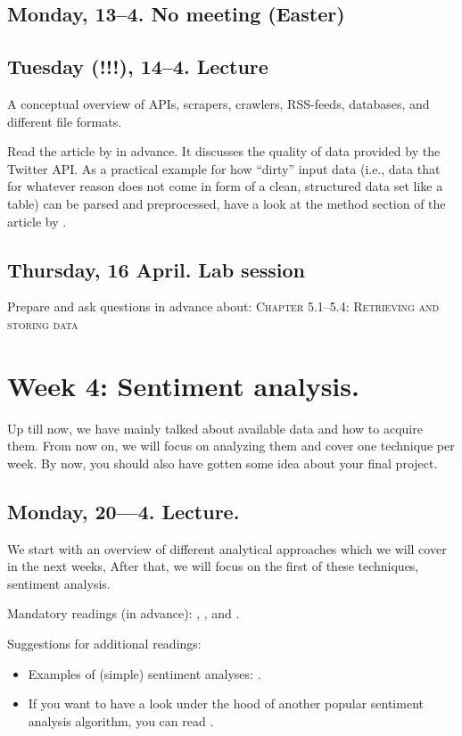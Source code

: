 \subsection*{Monday, 13--4. No meeting (Easter)}
\subsection*{Tuesday (!!!), 14--4. Lecture}
A conceptual overview of APIs, scrapers, crawlers, RSS-feeds, databases, and different file formats.

Read the article by \cite{Morstatter2013} in advance. It discusses the quality of data provided by the Twitter API. As a practical example for how ``dirty'' input data (i.e., data that for whatever reason does not come in form of a clean, structured data set like a table) can be parsed and preprocessed, have a look at the method section of the article by \cite{Lewis2013}. 


\subsection*{Thursday, 16 April. Lab session}
Prepare and ask questions in advance about:
\textsc{ Chapter 5.1--5.4: Retrieving and storing data}\\




\section*{Week 4: Sentiment analysis.}
Up till now, we have mainly talked about available data and how to acquire them. From now on, we will focus on analyzing them and cover one technique per week. By now, you should also have gotten some idea about your final project.


\subsection*{Monday, 20---4. Lecture.}
We start with an overview of different analytical approaches which we will cover in the next weeks, After that, we will focus on the first of these techniques, sentiment analysis.

Mandatory readings (in advance): \cite{GonzalezBailon2015},  \cite{Hutto2014}, and \cite{Vermeer2019}.

Suggestions for additional readings:
\begin{itemize}
	\item Examples of (simple) sentiment analyses: \cite{Huang2007,Pestian2012, Mostafa2013}. 
	\item If you want to have a look under the hood of another popular sentiment analysis algorithm, you can read \cite{Thelwall2012}.
\end{itemize}



